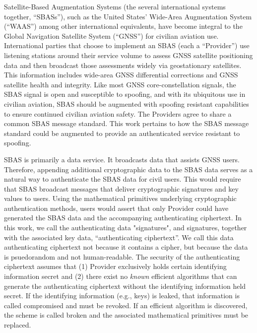 \documentclass[letterpaper,times]{IONconf/IONconf}
\begin{document}
Satellite-Based Augmentation Systems (the several international systems together, ``SBASs''), such as the United States' Wide-Area Augmentation System (``WAAS'') among other international equivalents, have become integral to the Global Navigation Satellite System (``GNSS'') for civilian aviation use.
International parties that choose to implement an SBAS (each a ``Provider'') use listening stations around their service volume to assess GNSS satellite positioning data and then broadcast those assessments widely via geostationary satellites.
This information includes wide-area GNSS differential corrections and GNSS satellite health and integrity.
Like most GNSS core-constellation signals, the SBAS signal is open and susceptible to spoofing, and with its ubiquitous use in civilian aviation, SBAS should be augmented with spoofing resistant capabilities to ensure continued civilian aviation safety.
The Providers agree to share a common SBAS message standard.
This work pertains to how the SBAS message standard could be augmented to provide an authenticated service resistant to spoofing.

SBAS is primarily a data service.
It broadcasts data that assists GNSS users.
Therefore, appending additional cryptographic data to the SBAS data serves as a natural way to authenticate the SBAS data for civil users.
This would require that SBAS broadcast messages that deliver cryptographic signatures and key values to users.
Using the mathematical primitives underlying cryptographic authentication methods, users would assert that only Provider could have generated the SBAS data and the accompanying authenticating ciphertext.
In this work, we call the authenticating data "signatures", and signatures, together with the associated key data, ``authenticating ciphertext''.
We call this data authenticating ciphertext not because it contains a cipher, but because the data is psuedorandom and not human-readable.
The security of the authenticating ciphertext assumes that (1) Provider exclusively holds certain identifying information secret and (2) there exist no {\em known} efficient algorithms that can generate the authenticating ciphertext without the identifying information held secret.
If the identifying information (e.g., keys) is leaked, that information is called compromised and must be revoked.
If an efficient algorithm is discovered, the scheme is called broken and the associated mathematical primitives must be replaced.
\end{document}
